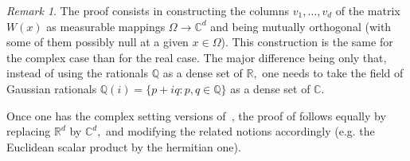 \documentclass{article}
\theoremstyle{definition}
\theoremstyle{remark}
\newtheorem{remark}[theorem]{Remark}
\numberwithin{equation}{section}
\newcommand{\reals}{\mathbb{R}}
\newcommand{\complex}{\mathbb{C}}
\newcommand{\1}{\mathbf{1}}
\newcommand{\complexball}[1]{\mathbf{\overline{B}}_{\complex^{{#1}}}}
\begin{document}

    \begin{remark}
        The proof consists in constructing the columns $v_1,\ldots,v_d$ of the matrix $W(x)$
        as measurable mappings $\Omega \rightarrow \complex^d$ and being mutually orthogonal
        (with some of them possibly null at a given $x \in \Omega$).
        This construction is the same for the complex case than for the real case.
        The major difference being only that, instead of using the rationals $\mathbb{Q}$ as a dense set of $\reals,$
        one needs to take the field of Gaussian rationals $\mathbb{Q}(i) = \{p+iq\colon p,q\in\mathbb{Q}\}$
        as a dense set of $\complex.$
    \end{remark}

    Once one has the complex setting versions of~\cite[Lemmata~3.8, 3.9 and~3.10]{Cruz_Uribe_Bownik_Extrapolation},
    the proof of \cite[Theorem 3.7]{Cruz_Uribe_Bownik_Extrapolation} follows equally by replacing $\reals^d$ by $\complex^d,$
    and modifying the related notions accordingly (e.g. the Euclidean scalar product by the hermitian one).
    
\end{document}
